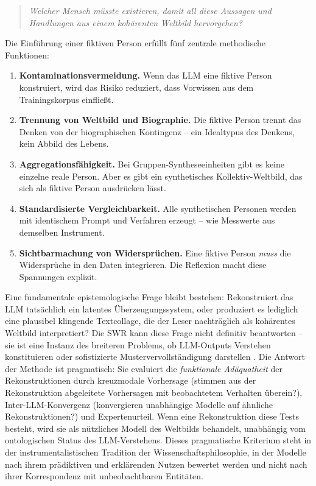 \documentclass[11pt,a4paper]{article}
\theoremstyle{definition}
\theoremstyle{plain}
\theoremstyle{remark}
\begin{document}
\begin{quote}
\emph{Welcher Mensch m\"usste existieren, damit all diese Aussagen und Handlungen aus einem koh\"arenten Weltbild hervorgehen?}
\end{quote}

Die Einf\"uhrung einer fiktiven Person erf\"ullt f\"unf zentrale methodische Funktionen:

\begin{enumerate}[leftmargin=*]
  \item \textbf{Kontaminationsvermeidung.} Wenn das LLM eine fiktive Person konstruiert, wird das Risiko reduziert, dass Vorwissen aus dem Trainingskorpus einflie\ss{}t.
  \item \textbf{Trennung von Weltbild und Biographie.} Die fiktive Person trennt das Denken von der biographischen Kontingenz -- ein Idealtypus des Denkens, kein Abbild des Lebens.
  \item \textbf{Aggregationsf\"ahigkeit.} Bei Gruppen-Syntheseeinheiten gibt es keine einzelne reale Person. Aber es gibt ein synthetisches Kollektiv-Weltbild, das sich als fiktive Person ausdr\"ucken l\"asst.
  \item \textbf{Standardisierte Vergleichbarkeit.} Alle synthetischen Personen werden mit identischem Prompt und Verfahren erzeugt -- wie Messwerte aus demselben Instrument.
  \item \textbf{Sichtbarmachung von Widerspr\"uchen.} Eine fiktive Person \emph{muss} die Widerspr\"uche in den Daten integrieren. Die Reflexion macht diese Spannungen explizit.
\end{enumerate}

Eine fundamentale epistemologische Frage bleibt bestehen: Rekonstruiert das LLM tats\"achlich ein latentes \"Uberzeugungssystem, oder produziert es lediglich eine plausibel klingende Textcollage, die der Leser nachtr\"aglich als koh\"arentes Weltbild interpretiert? Die SWR kann diese Frage nicht definitiv beantworten -- sie ist eine Instanz des breiteren Problems, ob LLM-Outputs Verstehen konstituieren oder sofistizierte Mustervervollst\"andigung darstellen \citep{Messeri2024}. Die Antwort der Methode ist pragmatisch: Sie evaluiert die \emph{funktionale Ad\"aquatheit} der Rekonstruktionen durch kreuzmodale Vorhersage (stimmen aus der Rekonstruktion abgeleitete Vorhersagen mit beobachtetem Verhalten \"uberein?), Inter-LLM-Konvergenz (konvergieren unabh\"angige Modelle auf \"ahnliche Rekonstruktionen?) und Expertenurteil. Wenn eine Rekonstruktion diese Tests besteht, wird sie als n\"utzliches Modell des Weltbilds behandelt, unabh\"angig vom ontologischen Status des LLM-\glqq Verstehens\grqq{}. Dieses pragmatische Kriterium steht in der instrumentalistischen Tradition der Wissenschaftsphilosophie, in der Modelle nach ihrem pr\"adiktiven und erkl\"arenden Nutzen bewertet werden und nicht nach ihrer Korrespondenz mit unbeobachtbaren Entit\"aten.
\end{document}
